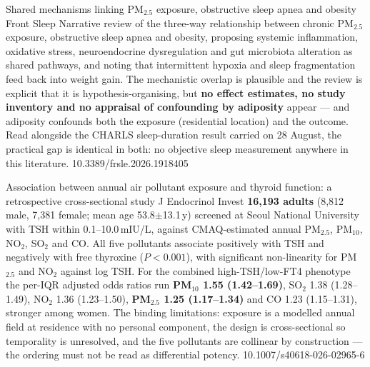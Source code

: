 \documentclass[10pt]{article}
\begin{document}

{Shared mechanisms linking PM$_{2.5}$ exposure, obstructive sleep apnea and obesity}
{Front Sleep}
{Narrative review of the three-way relationship between chronic PM$_{2.5}$ exposure,
obstructive sleep apnea and obesity, proposing systemic inflammation, oxidative stress,
neuroendocrine dysregulation and gut microbiota alteration as shared pathways, and noting
that intermittent hypoxia and sleep fragmentation feed back into weight gain. The
mechanistic overlap is plausible and the review is explicit that it is
hypothesis-organising, but \textbf{no effect estimates, no study inventory and no
appraisal of confounding by adiposity} appear --- and adiposity confounds both the
exposure (residential location) and the outcome. Read alongside the CHARLS sleep-duration
result carried on 28 August, the practical gap is identical in both: no objective sleep
measurement anywhere in this literature.}
{10.3389/frsle.2026.1918405}

\clearpage


{Association between annual air pollutant exposure and thyroid function: a retrospective
cross-sectional study}
{J Endocrinol Invest}
{\textbf{16{,}193 adults} (8{,}812 male, 7{,}381 female; mean age 53.8$\pm$13.1\,y)
screened at Seoul National University with TSH within 0.1--10.0\,mIU/L, against
CMAQ-estimated annual PM$_{2.5}$, PM$_{10}$, NO$_2$, SO$_2$ and CO. All five pollutants
associate positively with TSH and negatively with free thyroxine ($P<0.001$), with
significant non-linearity for PM$_{2.5}$ and NO$_2$ against log TSH. For the combined
high-TSH/low-FT4 phenotype the per-IQR adjusted odds ratios run
\textbf{PM$_{10}$ 1.55 (1.42--1.69)}, SO$_2$ 1.38 (1.28--1.49), NO$_2$ 1.36 (1.23--1.50),
\textbf{PM$_{2.5}$ 1.25 (1.17--1.34)} and CO 1.23 (1.15--1.31), stronger among women. The
binding limitations: exposure is a modelled annual field at residence with no personal
component, the design is cross-sectional so temporality is unresolved, and the five
pollutants are collinear by construction --- the ordering must not be read as
differential potency.}
{10.1007/s40618-026-02965-6}

\end{document}
